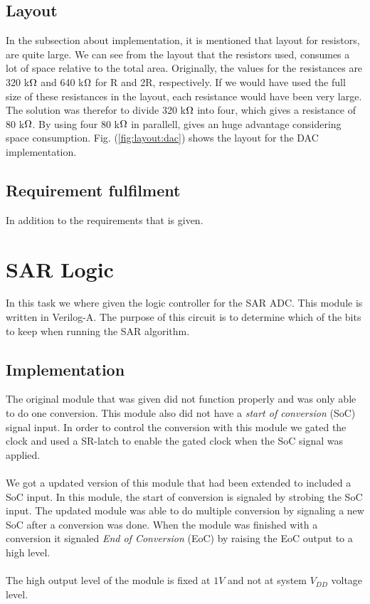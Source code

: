 \documentclass[english, 12pt, a4paper]{ifimaster}
\begin{document}
\subsection{Layout}
In the subsection about implementation, it is mentioned that layout for resistors, are quite 
large. We can see from the layout that the resistors used, consumes a lot of space relative to the total area. Originally, the values for the resistances are
320 k\(\ohm\) and 640 k\(\ohm\) for R and 2R, respectively. If we would have used the full size of these resistances in the layout, each resistance would have been
very large. The solution was therefor to divide 320 k\(\ohm\) into four, which gives a resistance of 80 k\(\ohm\). By using four 80 k\(\ohm\) in parallell, gives an huge
advantage considering space consumption. Fig. (\ref{fig:layout:dac}) shows the layout for the DAC implementation.

\subsection{Requirement fulfilment}
In addition to the requirements that is given. 

\section{SAR Logic}
In this task we where given the logic controller for the SAR ADC. This module is written in Verilog-A. 
The purpose of this circuit is to determine which of the bits to keep when running the SAR algorithm.

\subsection{Implementation}
The original module that was given did not function properly and was only able to do one conversion. This module also did not have a \textit{start of conversion} (SoC) signal input.
In order to control the conversion with this module we gated the clock and used a SR-latch to enable the gated clock when the SoC signal was applied.\\
\\
We got a updated version of this module that had been extended to included a SoC input. In this module, the start of conversion is signaled by strobing the SoC input.
The updated module was able to do multiple conversion by signaling a new SoC after a conversion was done. 
When the module was finished with a conversion it signaled \textit{End of Conversion} (EoC) by raising the EoC output to a high level. \\
\\
The high output level of the module is fixed at \(1 V\) and not at system \(V_{DD}\) voltage level.
\end{document}
